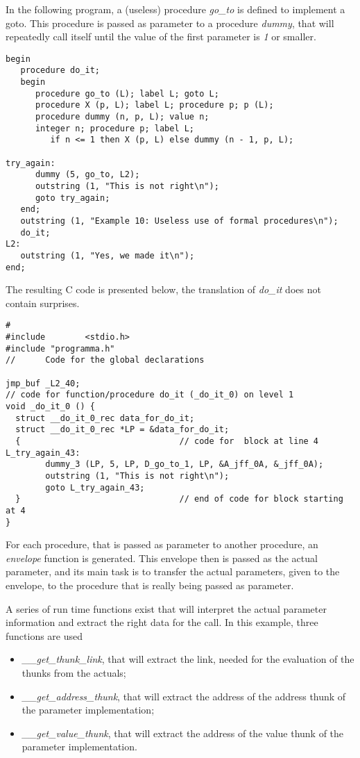 \documentclass[11pt]{article}
\begin{document}
In the following program, a (useless) procedure {\em go\_to}
is defined to implement a goto. This procedure is passed as parameter
to a procedure {\em dummy}, that will repeatedly call itself until
the value of the first parameter is {\em 1} or smaller.
{\footnotesize
\begin{verbatim}
begin
   procedure do_it;
   begin
      procedure go_to (L); label L; goto L;
      procedure X (p, L); label L; procedure p; p (L);
      procedure dummy (n, p, L); value n; 
      integer n; procedure p; label L;
         if n <= 1 then X (p, L) else dummy (n - 1, p, L);

try_again:
      dummy (5, go_to, L2);
      outstring (1, "This is not right\n");
      goto try_again;
   end;
   outstring (1, "Example 10: Useless use of formal procedures\n");
   do_it;
L2:
   outstring (1, "Yes, we made it\n");
end;
\end{verbatim}
}
The resulting C code is presented below, the translation of {\em do\_it} does not contain surprises.
{\footnotesize
\begin{verbatim}
#
#include        <stdio.h>
#include "programma.h"
//      Code for the global declarations

jmp_buf _L2_40;
// code for function/procedure do_it (_do_it_0) on level 1
void _do_it_0 () {
  struct __do_it_0_rec data_for_do_it;
  struct __do_it_0_rec *LP = &data_for_do_it;
  {                                // code for  block at line 4 
L_try_again_43:
        dummy_3 (LP, 5, LP, D_go_to_1, LP, &A_jff_0A, &_jff_0A);
        outstring (1, "This is not right\n");
        goto L_try_again_43;
  }                                // end of code for block starting at 4
}
\end{verbatim}
}
For each procedure, that is passed as parameter to another procedure, an
{\em envelope} function is generated. This envelope then is passed
as the actual parameter, and its main task is to transfer
the actual parameters, given to the envelope, to the procedure that is really
being passed as parameter.

A series of run time functions exist that will interpret the actual
parameter information and extract the right data for the call. In this example,
three functions are used
\begin{itemize}
\item {\em \_\_get\_thunk\_link}, that will extract the link, needed
for the evaluation of the thunks from the actuals;
\item {\em \_\_get\_address\_thunk}, that will extract the address
of the address thunk of the parameter implementation;
\item {\em \_\_get\_value\_thunk}, that will extract the
address of the value thunk of the parameter implementation.
\end{itemize}
\end{document}
